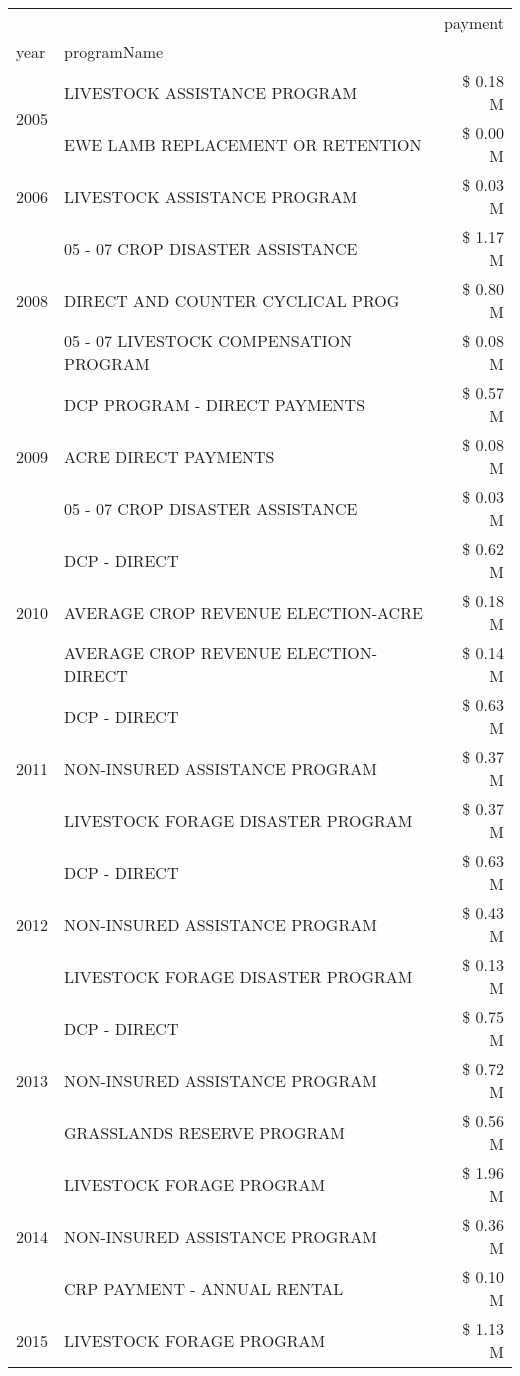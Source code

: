 \begin{tabular}{llr}
\toprule
 &  & payment \\
year & programName &  \\
\midrule
\multirow[t]{2}{*}{2005} & LIVESTOCK ASSISTANCE PROGRAM & \$ 0.18 M \\
 & EWE LAMB REPLACEMENT OR RETENTION & \$ 0.00 M \\
\cline{1-3}
2006 & LIVESTOCK ASSISTANCE PROGRAM & \$ 0.03 M \\
\cline{1-3}
\multirow[t]{3}{*}{2008} & 05 - 07 CROP DISASTER ASSISTANCE & \$ 1.17 M \\
 & DIRECT AND COUNTER CYCLICAL PROG & \$ 0.80 M \\
 & 05 - 07 LIVESTOCK COMPENSATION PROGRAM & \$ 0.08 M \\
\cline{1-3}
\multirow[t]{3}{*}{2009} & DCP PROGRAM - DIRECT PAYMENTS & \$ 0.57 M \\
 & ACRE DIRECT PAYMENTS & \$ 0.08 M \\
 & 05 - 07 CROP DISASTER ASSISTANCE & \$ 0.03 M \\
\cline{1-3}
\multirow[t]{3}{*}{2010} & DCP - DIRECT & \$ 0.62 M \\
 & AVERAGE CROP REVENUE ELECTION-ACRE & \$ 0.18 M \\
 & AVERAGE CROP REVENUE ELECTION-DIRECT & \$ 0.14 M \\
\cline{1-3}
\multirow[t]{3}{*}{2011} & DCP - DIRECT & \$ 0.63 M \\
 & NON-INSURED ASSISTANCE PROGRAM & \$ 0.37 M \\
 & LIVESTOCK FORAGE DISASTER PROGRAM & \$ 0.37 M \\
\cline{1-3}
\multirow[t]{3}{*}{2012} & DCP - DIRECT & \$ 0.63 M \\
 & NON-INSURED ASSISTANCE PROGRAM & \$ 0.43 M \\
 & LIVESTOCK FORAGE DISASTER PROGRAM & \$ 0.13 M \\
\cline{1-3}
\multirow[t]{3}{*}{2013} & DCP - DIRECT & \$ 0.75 M \\
 & NON-INSURED ASSISTANCE PROGRAM & \$ 0.72 M \\
 & GRASSLANDS RESERVE PROGRAM & \$ 0.56 M \\
\cline{1-3}
\multirow[t]{3}{*}{2014} & LIVESTOCK FORAGE PROGRAM & \$ 1.96 M \\
 & NON-INSURED ASSISTANCE PROGRAM & \$ 0.36 M \\
 & CRP PAYMENT - ANNUAL RENTAL & \$ 0.10 M \\
\cline{1-3}
\multirow[t]{3}{*}{2015} & LIVESTOCK FORAGE PROGRAM & \$ 1.13 M \\

\end{tabular}
